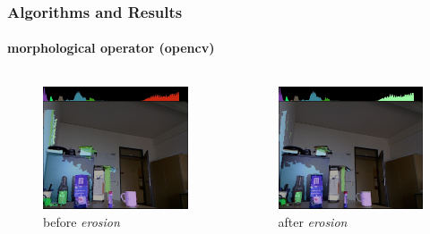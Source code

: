 \documentclass[]{beamer}
\begin{document}
\begin{frame}
    \frametitle{Algorithms and Results}
    \framesubtitle{morphological operator (opencv)}
    \begin{columns}
        \begin{column}{5 cm} 
        \begin{figure}[h]
            \centering
            \includegraphics[width=5cm]{../images/cluster_bli_erode.jpg}
            \caption{before \emph{erosion}}
        \end{figure}
            
        \end{column}
        \begin{column}{5 cm}
            \begin{figure}[h]
                \centering
                \includegraphics[width=5cm]{../images/cluster_im_erode.jpg}
                \caption{after \emph{erosion}}
            \end{figure}
        \end{column}
    \end{columns}
\end{frame}
\end{document}
